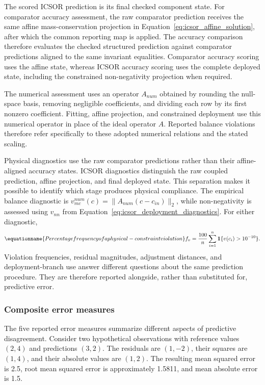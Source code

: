 The scored ICSOR prediction is its final checked component state. For comparator accuracy assessment, the raw comparator prediction receives the same affine mass-conservation projection in Equation~\eqref{eq:icsor_affine_solution}, after which the common reporting map is applied. The accuracy comparison therefore evaluates the checked structured prediction against comparator predictions aligned to the same invariant equalities. Comparator accuracy scoring uses the affine state, whereas ICSOR accuracy scoring uses the complete deployed state, including the constrained non-negativity projection when required.

The numerical assessment uses an operator \(A_{num}\) obtained by rounding the null-space basis, removing negligible coefficients, and dividing each row by its first nonzero coefficient. Fitting, affine projection, and constrained deployment use this numerical operator in place of the ideal operator \(A\). Reported balance violations therefore refer specifically to these adopted numerical relations and the stated scaling.

Physical diagnostics use the raw comparator predictions rather than their affine-aligned accuracy states. ICSOR diagnostics distinguish the raw coupled prediction, affine projection, and final deployed state. This separation makes it possible to identify which stage produces physical compliance. The empirical balance diagnostic is \(v_{mc}^{num}(c)=\|A_{num}(c-c_{in})\|_2\), while non-negativity is assessed using \(v_{nn}\) from Equation~\eqref{eq:icsor_deployment_diagnostics}. For either diagnostic,
\begin{equation}
\equationname{Percentage frequency of a physical-constraint violation}
\label{eq:icsor_violation_frequency}
f_v=\frac{100}{n}\sum_{i=1}^{n}
\mathbf{1}\{v(c_i)>10^{-10}\}.
\end{equation}
Violation frequencies, residual magnitudes, adjustment distances, and deployment-branch use answer different questions about the same prediction procedure. They are therefore reported alongside, rather than substituted for, predictive error.

\subsubsection{Composite error measures}

The five reported error measures summarize different aspects of predictive disagreement. Consider two hypothetical observations with reference values \((2,4)\) and predictions \((3,2)\). The residuals are \((1,-2)\), their squares are \((1,4)\), and their absolute values are \((1,2)\). The resulting mean squared error is 2.5, root mean squared error is approximately 1.5811, and mean absolute error is 1.5.


